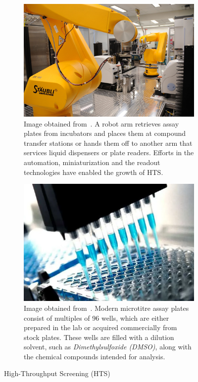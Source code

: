 \begin{figure}[htbp]
    \centering
    \begin{subfigure}[b]{0.48\textwidth}
        \centering
        \includegraphics[width=\textwidth]{figures/hts_robot.png}
        \caption{Image obtained from~\cite{hts_robot}. A robot arm retrieves assay plates from incubators and places them at compound transfer stations or hands them off to another arm that services liquid dispensers or plate readers. Efforts in the automation, miniaturization and the readout technologies have enabled the growth of HTS.}
    \label{fig:hts_robot}
    \end{subfigure}
    \hfill
    \begin{subfigure}[b]{0.48\textwidth}
        \centering
        \includegraphics[width=\textwidth]{figures/hts.png}
        \caption{Image obtained from~\cite{hts_plates}. Modern microtitre assay plates consist of multiples of 96 wells, which are either prepared in the lab or acquired commercially from stock plates. These wells are filled with a dilution solvent, such as \emph{Dimethylsulfoxide (DMSO)}, along with the chemical compounds intended for analysis.}
        \label{fig:hts_plates}
    \end{subfigure}
    \caption{High-Throughput Screening (HTS)}
    \label{fig:hts}
\end{figure}


